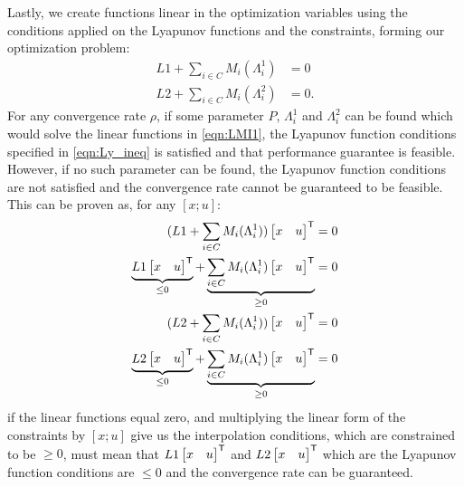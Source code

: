 Lastly, we create functions linear in the optimization variables using the conditions applied on the Lyapunov functions and the constraints, forming our optimization problem:
\begin{subequations} \label{eqn:LMI1}
	\begin{align*} 
		L1 + \sum_{i\in C} M_i(\Lambda_i^1) &= 0  \\
		L2 + \sum_{i\in C} M_i(\Lambda_i^2) &= 0.
	\end{align*}
\end{subequations}
For any convergence rate $\rho$, if some parameter $P$, $\Lambda_i^1$ and $\Lambda_i^2$ can be found which would solve the linear functions in \eqref{eqn:LMI1}, the Lyapunov function conditions specified in \eqref{eqn:Ly_ineq} is satisfied and that performance guarantee is feasible. However, if no such parameter can be found, the Lyapunov function conditions are not satisfied and the convergence rate cannot be guaranteed to be feasible. This can be proven as, for any $[x; u]$:
\begin{subequations} \label{eqn:LMI1}
	\begin{align*} 
		(L1 + \sum_{i\in C} M_i(\Lambda_i^1))\begin{bmatrix}x & u\end{bmatrix}^{\mathsf{T}} &= 0  \\
		\underbrace{L1\begin{bmatrix}x & u\end{bmatrix}^{\mathsf{T}}}_{\leq 0} + \underbrace{\sum_{i\in C} M_i(\Lambda_i^1)\begin{bmatrix}x & u\end{bmatrix}^{\mathsf{T}}}_{\geq 0} &= 0  \\
		(L2 + \sum_{i\in C} M_i(\Lambda_i^1))\begin{bmatrix}x & u\end{bmatrix}^{\mathsf{T}} &= 0  \\
		\underbrace{L2\begin{bmatrix}x & u\end{bmatrix}^{\mathsf{T}}}_{\leq 0} + \underbrace{\sum_{i\in C} M_i(\Lambda_i^1)\begin{bmatrix}x & u\end{bmatrix}^{\mathsf{T}}}_{\geq 0} &= 0  \\
	\end{align*}
\end{subequations}
if the linear functions equal zero, and multiplying the linear form of the constraints by $[x; u]$ give us the interpolation conditions, which are constrained to be $\geq 0$, must mean that $L1\begin{bmatrix}x & u\end{bmatrix}^{\mathsf{T}}$ and $L2\begin{bmatrix}x & u\end{bmatrix}^{\mathsf{T}}$ which are the Lyapunov function conditions are $\leq 0$ and the convergence rate can be guaranteed.

